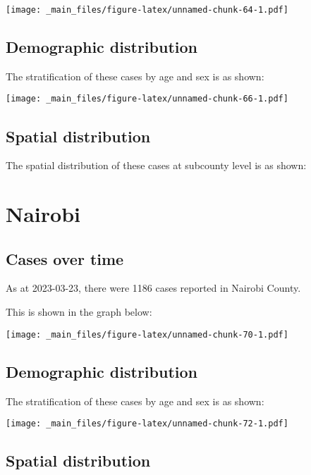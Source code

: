 \documentclass[
]{book}
\begin{document}
\texttt{[image: \_main\_files/figure-latex/unnamed-chunk-64-1.pdf]}

\hypertarget{demographic-distribution-10}{%
\section{Demographic distribution}\label{demographic-distribution-10}}

The stratification of these cases by age and sex is as shown:

\texttt{[image: \_main\_files/figure-latex/unnamed-chunk-66-1.pdf]}

\hypertarget{spatial-distribution-10}{%
\section{Spatial distribution}\label{spatial-distribution-10}}

The spatial distribution of these cases at subcounty level is as shown:

\hypertarget{nairobi}{%
\chapter{Nairobi}\label{nairobi}}

\hypertarget{cases-over-time-11}{%
\section{Cases over time}\label{cases-over-time-11}}

As at 2023-03-23, there were 1186 cases reported in Nairobi County.

This is shown in the graph below:

\texttt{[image: \_main\_files/figure-latex/unnamed-chunk-70-1.pdf]}

\hypertarget{demographic-distribution-11}{%
\section{Demographic distribution}\label{demographic-distribution-11}}

The stratification of these cases by age and sex is as shown:

\texttt{[image: \_main\_files/figure-latex/unnamed-chunk-72-1.pdf]}

\hypertarget{spatial-distribution-11}{%
\section{Spatial distribution}\label{spatial-distribution-11}}
\end{document}
